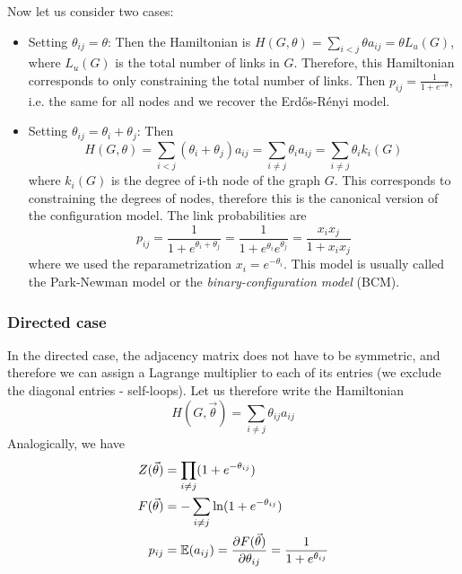 Now let us consider two cases:
\begin{itemize}
    \item Setting $\theta_{ij} = \theta$: Then the Hamiltonian is $H(G,\theta) = \sum_{i < j}\theta a_{ij} = \theta L_u(G)$, where $L_u(G)$ is the total number of links in $G$. Therefore, this Hamiltonian corresponds to only constraining the total number of links. Then $p_{ij} = \frac{1}{1 + e^{-\theta}}$, i.e. the same for all nodes and we recover the Erdős-Rényi model.
    \item Setting $\theta_{ij} = \theta_i + \theta_j$: Then 
    \begin{equation}
        H(G,\theta) = \sum_{i < j}(\theta_i + \theta_j) a_{ij} = \sum_{i\neq j}\theta_i a_{ij} = \sum_{i\neq j}\theta_i k_i(G)
    \end{equation}where $k_i(G)$ is the degree of i-th node of the graph $G$. This corresponds to constraining the degrees of nodes, therefore this is the canonical version of the configuration model. The link probabilities are
    \begin{equation}
        p_{ij} = \frac{1}{1 + e^{\theta_i + \theta_j}} = \frac{1}{1 + e^{\theta_i}e^{\theta_j}} = \frac{x_i x_j}{1 + x_i x_j}
    \end{equation}
    where we used the reparametrization $x_i = e^{-\theta_i}$. This model is usually called the Park-Newman model or the \textit{binary-configuration model} (BCM).
\end{itemize}

\subsubsection{Directed case}
In the directed case, the adjacency matrix does not have to be symmetric, and therefore we can assign a Lagrange multiplier to each of its entries (we exclude the diagonal entries - self-loops). Let us therefore write the Hamiltonian
\begin{equation}
    H(G,\vec{\theta}) = \sum_{i\neq j} \theta_{ij}a_{ij}
\end{equation}
Analogically, we have
\begin{align}
    Z(\vec{\theta}) &= \prod_{i\neq j}(1 + e^{-\theta_{ij}}) \\
    F(\vec{\theta}) &= -\sum_{i\neq j}\ln(1 + e^{-\theta_{ij}}) \\
    p_{ij} &= \mathbb{E}(a_{ij}) = \frac{\partial F(\vec{\theta})}{\partial \theta_{ij}} = \frac{1}{1 + e^{\theta_{ij}}}
\end{align}

